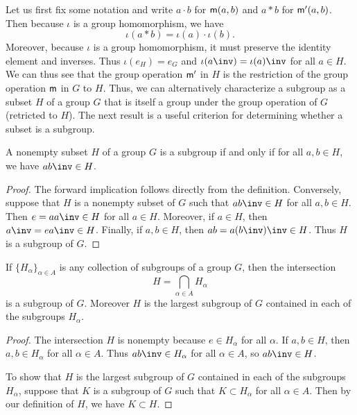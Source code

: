 Let us first fix some notation and write \(a \cdot b\) for \({\mathsf{m}}(a,b)\) and
\(a * b\) for \({\mathsf{m}}'(a,b)\). Then because \(\iota\) is a group homomorphism,
we have
\[
    \iota(a * b) = \iota(a) \cdot \iota(b).
\]
Moreover, because \(\iota\) is a group homomorphism, it must preserve the
identity element and inverses. Thus \(\iota(e_H) = e_G\) and \(\iota(a\inv) =
\iota(a)\inv\) for all \(a \in H\). We can thus see that the group operation
\({\mathsf{m}}'\) in \(H\) is the restriction of the group operation \({\mathsf{m}}\) in \(G\)
to \(H\). Thus, we can alternatively characterize a subgroup as a subset \(H\)
of a group \(G\) that is itself a group under the group operation of \(G\)
(retricted to \(H\)). The next result is a useful criterion for determining
whether a subset is a subgroup.

\begin{theorem}
    \label{thm:subgroup-test}
    A nonempty subset \(H\) of a group \(G\) is a subgroup if and only if for
    all \(a, b \in H\), we have \(ab\inv \in H\).
\end{theorem}

\begin{proof}
    The forward implication follows directly from the definition. Conversely,
    suppose that \(H\) is a nonempty subset of \(G\) such that \(ab\inv \in H\)
    for all \(a, b \in H\). Then \(e = aa\inv \in H\) for all \(a \in H\).
    Moreover, if \(a \in H\), then \(a\inv = ea\inv \in H\). Finally, if \(a, b
    \in H\), then \(ab = a(b\inv)\inv \in H\). Thus \(H\) is a subgroup of
    \(G\).
\end{proof}

\begin{theorem}
    \label{thm:intersection-subgroups}
    If \(\{H_{\alpha}\}_{\alpha \in A}\) is any collection of subgroups of a
    group \(G\), then the intersection
    \[
        H = \bigcap_{\alpha \in A} H_{\alpha}
    \]
    is a subgroup of \(G\). Moreover \(H\) is the largest subgroup of \(G\)
    contained in each of the subgroups \(H_{\alpha}\).
\end{theorem}

\begin{proof}
    The intersection \(H\) is nonempty because \(e \in H_\alpha\) for all
    \(\alpha\). If \(a, b \in H\), then \(a, b \in H_\alpha\) for all \(\alpha
    \in A\). Thus \(ab\inv \in H_\alpha\) for all \(\alpha \in A\), so \(ab\inv
    \in H\).

    To show that \(H\) is the largest subgroup of \(G\) contained in each of the
    subgroups \(H_{\alpha}\), suppose that \(K\) is a subgroup of \(G\) such
    that \(K \subset H_{\alpha}\) for all \(\alpha \in A\). Then by our
    definition of \(H\), we have \(K \subset H\).
\end{proof}

